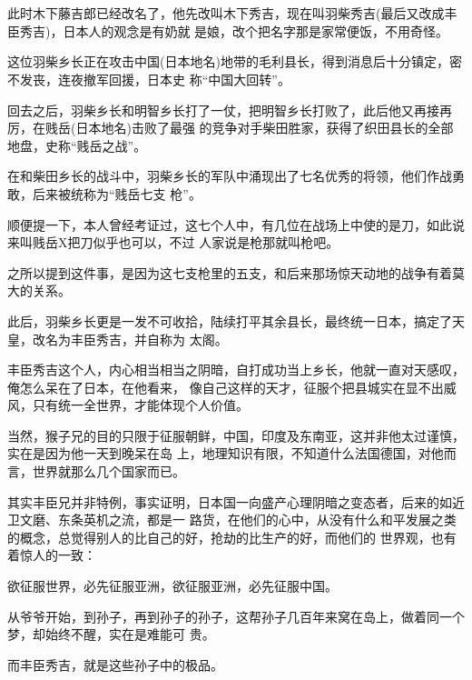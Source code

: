 \documentclass[11pt,a4paper,onecolumn]{article}
\begin{document}
\section[\thesection]{}

此时木下藤吉郎已经改名了，他先改叫木下秀吉，现在叫羽柴秀吉(最后又改成丰臣秀吉)，日本人的观念是有奶就
是娘，改个把名字那是家常便饭，不用奇怪。

这位羽柴乡长正在攻击中国(日本地名)地带的毛利县长，得到消息后十分镇定，密不发丧，连夜撤军回援，日本史
称``中国大回转''。

回去之后，羽柴乡长和明智乡长打了一仗，把明智乡长打败了，此后他又再接再厉，在贱岳(日本地名)击败了最强
的竞争对手柴田胜家，获得了织田县长的全部地盘，史称``贱岳之战''。

在和柴田乡长的战斗中，羽柴乡长的军队中涌现出了七名优秀的将领，他们作战勇敢，后来被统称为``贱岳七支
枪''。

顺便提一下，本人曾经考证过，这七个人中，有几位在战场上中使的是刀，如此说来叫贱岳X把刀似乎也可以，不过
人家说是枪那就叫枪吧。

之所以提到这件事，是因为这七支枪里的五支，和后来那场惊天动地的战争有着莫大的关系。

此后，羽柴乡长更是一发不可收拾，陆续打平其余县长，最终统一日本，搞定了天皇，改名为丰臣秀吉，并自称为
太阁。

丰臣秀吉这个人，内心相当相当之阴暗，自打成功当上乡长，他就一直对天感叹，俺怎么呆在了日本，在他看来，
像自己这样的天才，征服个把县城实在显不出威风，只有统一全世界，才能体现个人价值。

当然，猴子兄的目的只限于征服朝鲜，中国，印度及东南亚，这并非他太过谨慎，实在是因为他一天到晚呆在岛
上，地理知识有限，不知道什么法国德国，对他而言，世界就那么几个国家而已。

其实丰臣兄并非特例，事实证明，日本国一向盛产心理阴暗之变态者，后来的如近卫文磨、东条英机之流，都是一
路货，在他们的心中，从没有什么和平发展之类的概念，总觉得别人的比自己的好，抢劫的比生产的好，而他们的
世界观，也有着惊人的一致：

欲征服世界，必先征服亚洲，欲征服亚洲，必先征服中国。

从爷爷开始，到孙子，再到孙子的孙子，这帮孙子几百年来窝在岛上，做着同一个梦，却始终不醒，实在是难能可
贵。

而丰臣秀吉，就是这些孙子中的极品。

\section[\thesection]{}
\end{document}
